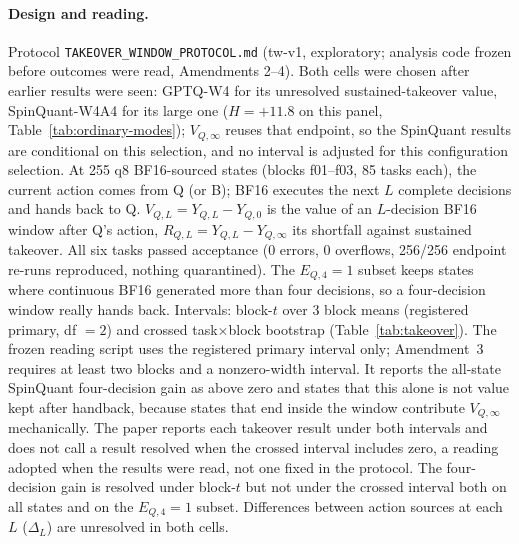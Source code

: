 \paragraph{Design and reading.} Protocol \texttt{TAKEOVER\_WINDOW\_PROTOCOL.md} (tw-v1, exploratory; analysis code frozen before outcomes were read, Amendments 2--4). Both cells were chosen after earlier results were seen: GPTQ-W4 for its unresolved sustained-takeover value, SpinQuant-W4A4 for its large one ($H=+11.8$\pp{} on this panel, Table~\ref{tab:ordinary-modes}); $V_{Q,\infty}$ reuses that endpoint, so the SpinQuant results are conditional on this selection, and no interval is adjusted for this configuration selection. At 255 q8 BF16-sourced states (blocks f01--f03, 85 tasks each), the current action comes from Q (or B); BF16 executes the next $L$ complete decisions and hands back to Q. $V_{Q,L}=Y_{Q,L}-Y_{Q,0}$ is the value of an $L$-decision BF16 window after Q's action, $R_{Q,L}=Y_{Q,L}-Y_{Q,\infty}$ its shortfall against sustained takeover. All six tasks passed acceptance (0 errors, 0 overflows, 256/256 endpoint re-runs reproduced, nothing quarantined). The $E_{Q,4}{=}1$ subset keeps states where continuous BF16 generated more than four decisions, so a four-decision window really hands back. Intervals: block-$t$ over 3 block means (registered primary, df $=2$) and crossed task$\times$block bootstrap (Table~\ref{tab:takeover}). The frozen reading script uses the registered primary interval only; Amendment~3 requires at least two blocks and a nonzero-width interval. It reports the all-state SpinQuant four-decision gain as above zero and states that this alone is not value kept after handback, because states that end inside the window contribute $V_{Q,\infty}$ mechanically. The paper reports each takeover result under both intervals and does not call a result resolved when the crossed interval includes zero, a reading adopted when the results were read, not one fixed in the protocol. The four-decision gain is resolved under block-$t$ but not under the crossed interval both on all states and on the $E_{Q,4}{=}1$ subset. Differences between action sources at each $L$ ($\Delta_L$) are unresolved in both cells. %
